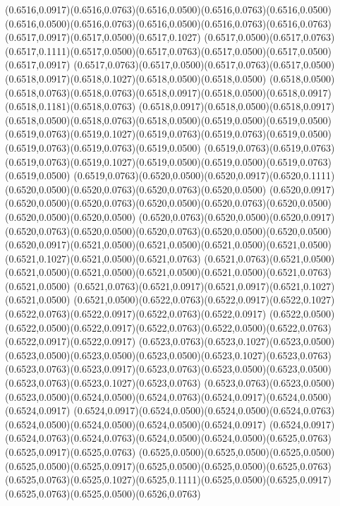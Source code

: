 (0.6516,0.0917)(0.6516,0.0763)(0.6516,0.0500)(0.6516,0.0763)(0.6516,0.0500)
\PST@Solid(0.6516,0.0500)(0.6516,0.0763)(0.6516,0.0500)(0.6516,0.0763)(0.6516,0.0763)(0.6517,0.0917)(0.6517,0.0500)(0.6517,0.1027)
(0.6517,0.0500)(0.6517,0.0763)(0.6517,0.1111)(0.6517,0.0500)(0.6517,0.0763)(0.6517,0.0500)(0.6517,0.0500)(0.6517,0.0917)
(0.6517,0.0763)(0.6517,0.0500)(0.6517,0.0763)(0.6517,0.0500)(0.6518,0.0917)(0.6518,0.1027)(0.6518,0.0500)(0.6518,0.0500)
(0.6518,0.0500)(0.6518,0.0763)(0.6518,0.0763)(0.6518,0.0917)(0.6518,0.0500)(0.6518,0.0917)(0.6518,0.1181)(0.6518,0.0763)
(0.6518,0.0917)(0.6518,0.0500)(0.6518,0.0917)(0.6518,0.0500)(0.6518,0.0763)(0.6518,0.0500)(0.6519,0.0500)(0.6519,0.0500)
(0.6519,0.0763)(0.6519,0.1027)(0.6519,0.0763)(0.6519,0.0763)(0.6519,0.0500)(0.6519,0.0763)(0.6519,0.0763)(0.6519,0.0500)
(0.6519,0.0763)(0.6519,0.0763)(0.6519,0.0763)(0.6519,0.1027)(0.6519,0.0500)(0.6519,0.0500)(0.6519,0.0763)(0.6519,0.0500)
(0.6519,0.0763)(0.6520,0.0500)(0.6520,0.0917)(0.6520,0.1111)(0.6520,0.0500)(0.6520,0.0763)(0.6520,0.0763)(0.6520,0.0500)
(0.6520,0.0917)(0.6520,0.0500)(0.6520,0.0763)(0.6520,0.0500)(0.6520,0.0763)(0.6520,0.0500)(0.6520,0.0500)(0.6520,0.0500)
(0.6520,0.0763)(0.6520,0.0500)(0.6520,0.0917)(0.6520,0.0763)(0.6520,0.0500)(0.6520,0.0763)(0.6520,0.0500)(0.6520,0.0500)
(0.6520,0.0917)(0.6521,0.0500)(0.6521,0.0500)(0.6521,0.0500)(0.6521,0.0500)(0.6521,0.1027)(0.6521,0.0500)(0.6521,0.0763)
(0.6521,0.0763)(0.6521,0.0500)(0.6521,0.0500)(0.6521,0.0500)(0.6521,0.0500)(0.6521,0.0500)(0.6521,0.0763)(0.6521,0.0500)
(0.6521,0.0763)(0.6521,0.0917)(0.6521,0.0917)(0.6521,0.1027)(0.6521,0.0500)
\PST@Solid(0.6521,0.0500)(0.6522,0.0763)(0.6522,0.0917)(0.6522,0.1027)(0.6522,0.0763)(0.6522,0.0917)(0.6522,0.0763)(0.6522,0.0917)
(0.6522,0.0500)(0.6522,0.0500)(0.6522,0.0917)(0.6522,0.0763)(0.6522,0.0500)(0.6522,0.0763)(0.6522,0.0917)(0.6522,0.0917)
(0.6523,0.0763)(0.6523,0.1027)(0.6523,0.0500)(0.6523,0.0500)(0.6523,0.0500)(0.6523,0.0500)(0.6523,0.1027)(0.6523,0.0763)
(0.6523,0.0763)(0.6523,0.0917)(0.6523,0.0763)(0.6523,0.0500)(0.6523,0.0500)(0.6523,0.0763)(0.6523,0.1027)(0.6523,0.0763)
(0.6523,0.0763)(0.6523,0.0500)(0.6523,0.0500)(0.6524,0.0500)(0.6524,0.0763)(0.6524,0.0917)(0.6524,0.0500)(0.6524,0.0917)
(0.6524,0.0917)(0.6524,0.0500)(0.6524,0.0500)(0.6524,0.0763)(0.6524,0.0500)(0.6524,0.0500)(0.6524,0.0500)(0.6524,0.0917)
(0.6524,0.0917)(0.6524,0.0763)(0.6524,0.0763)(0.6524,0.0500)(0.6524,0.0500)(0.6525,0.0763)(0.6525,0.0917)(0.6525,0.0763)
(0.6525,0.0500)(0.6525,0.0500)(0.6525,0.0500)(0.6525,0.0500)(0.6525,0.0917)(0.6525,0.0500)(0.6525,0.0500)(0.6525,0.0763)
(0.6525,0.0763)(0.6525,0.1027)(0.6525,0.1111)(0.6525,0.0500)(0.6525,0.0917)(0.6525,0.0763)(0.6525,0.0500)(0.6526,0.0763)
